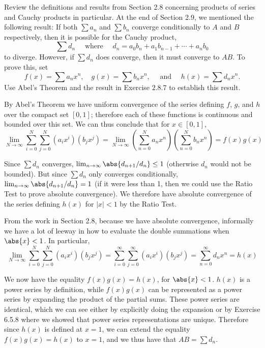 \begin{exercise}
Review the definitions and results from Section 2.8 concerning products of series and Cauchy products in particular. At the end of Section 2.9, we mentioned the following result: If both $\sum a_{n}$ and $\sum b_{n}$ converge conditionally to $A$ and $B$ respectively, then it is possible for the Cauchy product,
$$
\sum d_{n} \quad \text { where } \quad d_{n}=a_{0} b_{n}+a_{1} b_{n-1}+\cdots+a_{n} b_{0}
$$
to diverge. However, if $\sum d_{n}$ does converge, then it must converge to $A B$. To prove this, set
$$
f(x)=\sum a_{n} x^{n}, \quad g(x)=\sum b_{n} x^{n}, \quad \text { and } \quad h(x)=\sum d_{n} x^{n} .
$$
Use Abel's Theorem and the result in Exercise $2.8.7$ to establish this result.
\end{exercise}

\begin{solution}
By Abel's Theorem we have uniform convergence of the series defining \(f\), \(g\), and \(h\) over the compact set \([0,1]\); therefore each of these functions is continuous and bounded over this set. We can thus conclude that for \(x \in [0,1]\),
\[\lim_{N \to \infty} \sum^N_{i=0} \sum^N_{j=0} \left(a_i x^i\right) \left(b_j x^j\right) = \lim_{N \to \infty} \left(\sum^N_{n=0} a_n x^n\right) \left(\sum^N_{n=0} b_n x^n\right) = f(x) g(x)\]

Since \(\sum d_n\) converges, \(\lim_{n \to \infty} \abs{d_{n+1}/d_n} \leq 1\)  (otherwise \(d_n\) would not be bounded). But since \(\sum d_n\) only converges conditionally, \(\lim_{n \to \infty} \abs{d_{n+1}/d_n} = 1\) (if it were less than 1, then we could use the Ratio Test to prove absolute convergence). We therefore have absolute convergence of the series defining \(h(x)\) for \(|x| < 1\) by the Ratio Test.

From the work in Section 2.8, because we have absolute convergence, informally we have a lot of leeway in how to evaluate the double summations when \(\abs{x} < 1\). In particular,
\[\lim_{N \to \infty} \sum^N_{i=0} \sum^N_{j=0} \left(a_i x^i\right) \left(b_j x^j\right) = \sum^\infty_{i=0} \sum^\infty_{j=0} \left(a_i x^i\right) \left(b_j x^j\right) = \sum^\infty_{n=0} d_n x^n = h(x)\]

We now have the equality \(f(x)g(x) = h(x)\), for \(\abs{x} < 1\). \(h(x)\) is a power series by definition, while \(f(x)g(x)\) can be represented as a power series by expanding the product of the partial sums. These power series are identical, which we can see either by explicitly doing the expansion or by Exercise 6.5.8 where we showed that power series representations are unique. Therefore since \(h(x)\) is defined at \(x=1\), we can extend the equality \(f(x) g(x) = h(x)\) to \(x = 1\), and we thus have that \(AB =\sum d_n\).
\end{solution}

